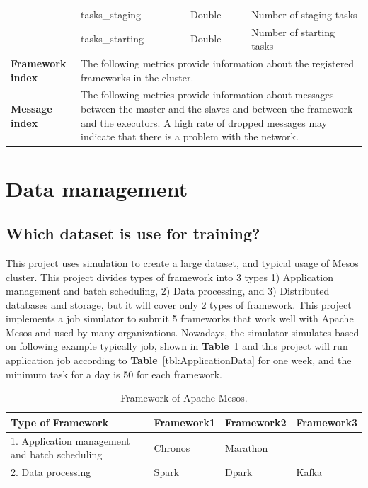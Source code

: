 \documentclass[12pt,oneside,openright,a4paper]{cpe-english-project}
\begin{document}
\begin{table}[!h]
\begin{tabular}{|p{}|p{}|p{}|p{}|}
    \cline{2-4} & tasks\_staging & Double & Number of staging tasks \\ 
    \cline{2-4} & tasks\_starting & Double & Number of starting tasks \\ 
    \hline
    \textbf{Framework index} & \multicolumn{3}{p{0.7\textwidth}|}{ The following metrics provide information about the registered frameworks in the cluster.} \\ 
    \hline
    \textbf{Message index} & \multicolumn{3}{p{0.7\textwidth}|}{ The following metrics provide information about messages between the master and the slaves and between the framework and the executors. A high rate of dropped messages may indicate that there is a problem with the network.} \\ 
    \hline
  \end{tabular}
\end{table}

\newpage

\section{Data management }

\subsection{Which dataset is use for training?}
\hspace{10mm}This project uses simulation to create a large dataset, and typical usage of Mesos cluster. This project divides types of framework into 3 types 1) Application management and batch scheduling, 2) Data processing, and 3) Distributed databases and storage, but it will cover only 2 types of framework. This project implements a job simulator to submit 5 frameworks that work well with Apache Mesos and used by many organizations. Nowadays, the simulator simulates based on following example typically job, shown in \textbf{Table}~\ref{tbl:MesosFramework} and this project will run application job according to \textbf{Table}~\ref{tbl:ApplicationData} for one week, and the minimum task for a day is 50 for each framework.

\begin{table}[!h]
  \caption{Framework of Apache Mesos.}\label{tbl:MesosFramework}
    \begin{tabular}{@{}|p{}|p{}|p{}|p{}|}
    \hline
    \textbf{Type of Framework} & \textbf{Framework1} & \textbf{Framework2} & \textbf{Framework3}\\
    \hline
    1. Application management and batch scheduling & Chronos & Marathon & \\
    \hline
    2. Data processing & Spark & Dpark & Kafka\\
    \hline
  \end{tabular}
\end{table}
\end{document}
